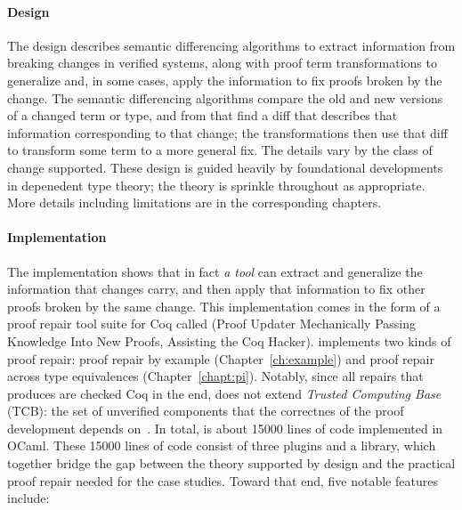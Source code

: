 \paragraph{Design}
The design describes semantic differencing algorithms to extract information from breaking changes in verified systems,
along with proof term transformations to generalize and, in some cases, apply the information to fix proofs broken by the change. %
The semantic differencing algorithms compare the old and new versions of a changed term or type,
and from that find a diff that describes that information corresponding to that change;
the transformations then use that diff to transform some term to a more general fix.
The details vary by the class of change supported.
These design is guided heavily by foundational developments in depenedent type theory;
the theory is sprinkle throughout as appropriate. %
More details including limitations are in the corresponding chapters. %

\paragraph{Implementation}
The implementation shows that in fact \textit{a tool} can extract and generalize the information that changes carry,
and then apply that information to fix other proofs broken by the same change.
This implementation comes in the form of a proof repair tool suite for Coq called \sysnamelong (Proof Updater Mechanically Passing Knowledge Into New Proofs, Assisting the Coq Hacker).
\sysnamelong implements two kinds of proof repair: proof repair by example (Chapter~\ref{ch:example}) %
and proof repair across type equivalences (Chapter~\ref{chapt:pi}). %
Notably, since all repairs that \sysnamelong produces are checked Coq in the end, \sysnamelong does not extend \textit{Trusted Computing Base} (TCB):
the set of unverified components that the correctnes of the proof development depends on~\cite{TODO}. %
In total, \sysnamelong is about 15000 lines of code implemented in OCaml.
These 15000 lines of code consist of three plugins and a library,
which together bridge the gap between the theory supported by design and the practical proof repair needed for the case studies.
Toward that end, five notable features include:


